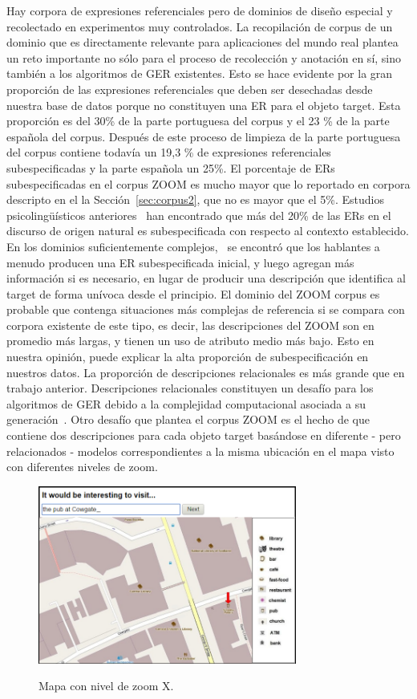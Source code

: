 Hay corpora de expresiones referenciales pero de dominios de dise\~no especial y recolectado en experimentos muy controlados. La recopilaci\'on de corpus de un dominio que es directamente relevante para aplicaciones del mundo real plantea un reto importante no s\'olo para el proceso de recolecci\'on y anotaci\'on en s\'{i}, sino tambi\'en a los algoritmos de GER existentes. Esto se hace evidente por la gran proporci\'on de las expresiones referenciales que deben ser desechadas desde nuestra base de datos porque no constituyen una ER para el objeto target. Esta proporci\'on es del 30\% de la parte portuguesa del corpus y el 23 \% de la parte espa\~nola del corpus.
Despu\'es de este proceso de limpieza de la parte portuguesa del corpus contiene todav\'{i}a un 19,3 \% de expresiones referenciales subespecificadas y la parte espa\~nola un 25\%. El porcentaje de ERs subespecificadas en el corpus ZOOM es mucho mayor que lo reportado en corpora descripto en el la Secci\'on~\ref{sec:corpus2}, que no es mayor que el 5\%. Estudios psicoling\"u\'{i}sticos anteriores~\cite{Clark1986} han encontrado que m\'as del 20\% de las ERs en el discurso de origen natural es subespecificada con respecto al contexto establecido. En los dominios suficientemente complejos,~\cite{Clark1986} se encontr\'o que los hablantes a menudo producen una ER subespecificada inicial, y luego agregan m\'as informaci\'on si es necesario, en lugar de producir una descripci\'on que identifica al target de forma un\'{i}voca desde el principio. El dominio del ZOOM corpus es probable que contenga situaciones m\'as complejas de referencia si se compara con corpora existente de este tipo, es decir, las descripciones del ZOOM son en promedio m\'as largas, y tienen un uso de atributo medio m\'as bajo. Esto en nuestra opini\'on, puede explicar la alta proporci\'on de subespecificaci\'on en nuestros datos. La proporci\'on de descripciones relacionales es m\'as grande que en trabajo anterior. Descripciones relacionales constituyen un desaf\'{i}o para los algoritmos de GER debido a la complejidad computacional asociada a su generaci\'on~\cite{survey}. Otro desaf\'{i}o que plantea el corpus ZOOM es el hecho de que contiene dos descripciones para cada objeto target bas\'andose en diferente - pero relacionados - modelos correspondientes a la misma ubicaci\'on en el mapa visto con diferentes niveles de zoom. 
\begin{figure}[ht]
\begin{center}
\includegraphics[width=8.5cm]{images/interface2.png}\\[0pt]
\caption{Mapa con nivel de zoom X.}
\label{interface2}
\end{center}
\end{figure}
